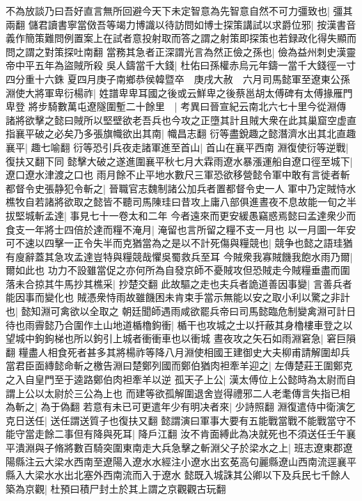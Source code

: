 不為放談乃曰吾好直言無所回避今天下未定智意為先智意自然不可力彊致也|{
	彊其兩翻}
儲君讀書寧當傚吾等竭力博識以待訪問如博士探策講試以求爵位邪|{
	按漢書音義作簡策難問例置案上在試者意投射取而答之謂之射策即探策也若録政化得失顯而問之謂之對策探吐南翻}
當務其急者正深謂光言為然正儉之孫也|{
	儉為益州刺史漢靈帝中平五年為盜賊所殺}
吳人鑄當千大錢|{
	杜佑曰孫權赤烏元年鑄一當千大錢徑一寸四分重十六銖}
夏四月庚子南鄉恭侯韓暨卒　庚戌大赦　六月司馬懿軍至遼東公孫淵使大將軍卑衍楊祚|{
	姓譜卑卑耳國之後或云鮮卑之後蔡邕胡太傅碑有太傅掾雁門卑登}
將步騎數萬屯遼隧圍塹二十餘里　|{
	考異曰晉宣紀云南北六七十里今從淵傳}
諸將欲擊之懿曰賊所以堅壁欲老吾兵也今攻之正墮其計且賊大衆在此其巢窟空虚直指襄平破之必矣乃多張旗幟欲出其南|{
	幟昌志翻}
衍等盡銳趣之懿潛濟水出其北直趣襄平|{
	趣七喻翻}
衍等恐引兵夜走諸軍進至首山|{
	首山在襄平西南}
淵復使衍等逆戰|{
	復扶又翻下同}
懿擊大破之遂進圍襄平秋七月大霖雨遼水暴漲運船自遼口徑至城下|{
	遼口遼水津渡之口也}
雨月餘不止平地水數尺三軍恐欲移營懿令軍中敢有言徙者斬都督令史張静犯令斬之|{
	晉職官志魏制諸公加兵者置都督令史一人}
軍中乃定賊恃水樵牧自若諸將欲取之懿皆不聽司馬陳珪曰昔攻上庸八部俱進晝夜不息故能一旬之半拔堅城斬孟達|{
	事見七十一卷太和二年}
今者遠來而更安緩愚竊惑焉懿曰孟達衆少而食支一年將士四倍於達而糧不淹月|{
	淹留也言所留之糧不支一月也}
以一月圖一年安可不速以四擊一正令失半而克猶當為之是以不計死傷與糧競也|{
	競争也懿之語珪猶有廋辭蓋其急攻孟達豈特與糧競哉懼吳蜀救兵至耳}
今賊衆我寡賊饑我飽水雨乃爾|{
	爾如此也}
功力不設雖當促之亦何所為自發京師不憂賊攻但恐賊走今賊糧垂盡而圍落未合掠其牛馬抄其樵采|{
	抄楚交翻}
此故驅之走也夫兵者詭道善因事變|{
	言善兵者能因事而變化也}
賊憑衆恃雨故雖饑困未肯束手當示無能以安之取小利以驚之非計也|{
	懿知淵可禽欲以全取之}
朝廷聞師遇雨咸欲罷兵帝曰司馬懿臨危制變禽淵可計日待也雨霽懿乃合圍作土山地道楯櫓鉤衝|{
	楯干也攻城之士以扞蔽其身櫓樓車登之以望城中鉤鉤梯也所以鉤引上城者衝衝車也以衝城}
晝夜攻之矢石如雨淵窘急|{
	窘巨隕翻}
糧盡人相食死者甚多其將楊祚等降八月淵使相國王建御史大夫柳甫請解圍却兵當君臣面縳懿命斬之檄告淵曰楚鄭列國而鄭伯猶肉袒牽羊迎之|{
	左傳楚莊王圍鄭克之入自皇門至于逵路鄭伯肉袒牽羊以逆}
孤天子上公|{
	漢太傅位上公懿時為太尉而自謂上公以太尉於三公為上也}
而建等欲孤解圍退舍豈得禮邪二人老耄傳言失指已相為斬之|{
	為于偽翻}
若意有未已可更遣年少有明决者來|{
	少詩照翻}
淵復遣侍中衛演乞克日送任|{
	送任謂送質子也復扶又翻}
懿謂演曰軍事大要有五能戰當戰不能戰當守不能守當走餘二事但有降與死耳|{
	降戶江翻}
汝不肯面縛此為决就死也不須送任壬午襄平潰淵與子脩將數百騎突圍東南走大兵急擊之斬淵父子於梁水之上|{
	班志遼東郡遼陽縣注云大梁水西南至遼陽入遼水水經注小遼水出玄莬高句麗縣遼山西南流逕襄平縣入大梁水水出北塞外西南流而入于遼水}
懿既入城誅其公卿以下及兵民七千餘人築為京觀|{
	杜預曰積尸封土於其上謂之京觀觀古玩翻}
